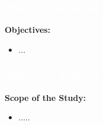 
\begin{frame}
  \frametitle{\textcolor{white}{\bf Objectives \& Scope}}
    \textbf{Objectives:}
    \begin{itemize}
        \item ...
    \end{itemize}
    
\end{frame}

\begin{frame}
  \frametitle{\textcolor{white}{\bf Objectives \& Scope}}

    \textbf{Scope of the Study:}
    \begin{itemize}
        \item .....
    \end{itemize}
\end{frame}

